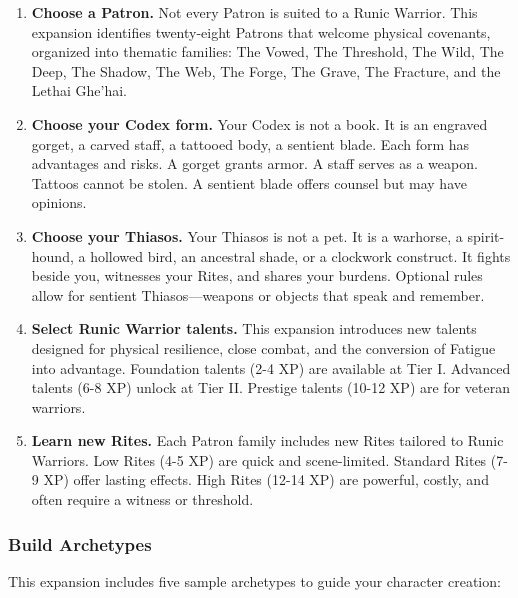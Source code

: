 \begin{enumerate}
\item \textbf{Choose a Patron.} Not every Patron is suited to a Runic Warrior. This expansion identifies twenty-eight Patrons that welcome physical covenants, organized into thematic families: The Vowed, The Threshold, The Wild, The Deep, The Shadow, The Web, The Forge, The Grave, The Fracture, and the Lethai Ghe'hai.

\item \textbf{Choose your Codex form.} Your Codex is not a book. It is an engraved gorget, a carved staff, a tattooed body, a sentient blade. Each form has advantages and risks. A gorget grants armor. A staff serves as a weapon. Tattoos cannot be stolen. A sentient blade offers counsel but may have opinions.

\item \textbf{Choose your Thiasos.} Your Thiasos is not a pet. It is a warhorse, a spirit-hound, a hollowed bird, an ancestral shade, or a clockwork construct. It fights beside you, witnesses your Rites, and shares your burdens. Optional rules allow for sentient Thiasos—weapons or objects that speak and remember.

\item \textbf{Select Runic Warrior talents.} This expansion introduces new talents designed for physical resilience, close combat, and the conversion of Fatigue into advantage. Foundation talents (2-4 XP) are available at Tier I. Advanced talents (6-8 XP) unlock at Tier II. Prestige talents (10-12 XP) are for veteran warriors.

\item \textbf{Learn new Rites.} Each Patron family includes new Rites tailored to Runic Warriors. Low Rites (4-5 XP) are quick and scene-limited. Standard Rites (7-9 XP) offer lasting effects. High Rites (12-14 XP) are powerful, costly, and often require a witness or threshold.
\end{enumerate}

\subsubsection{Build Archetypes}

This expansion includes five sample archetypes to guide your character creation:

